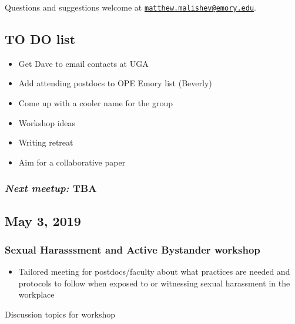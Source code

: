 \documentclass[10,portrait]{article}
\providecommand{\tightlist}{%
  \setlength{\itemsep}{0pt}\setlength{\parskip}{0pt}}
\begin{document}
Questions and suggestions welcome at
\href{mailto:matthew.malishev@emory.edu}{\nolinkurl{matthew.malishev@emory.edu}}.

\newpage  

\subsection{TO DO list}\label{to-do-list}

\begin{itemize}
\tightlist
\item
  Get Dave to email contacts at UGA\\
\item
  Add attending postdocs to OPE Emory list (Beverly)\\
\item
  Come up with a cooler name for the group\\
\item
  Workshop ideas\\
\item
  Writing retreat\\
\item
  Aim for a collaborative paper
\end{itemize}

\subsubsection{\texorpdfstring{\emph{Next meetup:}
TBA}{Next meetup: TBA}}\label{next-meetup-tba}

\newpage    

\subsection{May 3, 2019}\label{may-3-2019}

\subsubsection{Sexual Harasssment and Active Bystander
workshop}\label{sexual-harasssment-and-active-bystander-workshop}

\begin{itemize}
\tightlist
\item
  Tailored meeting for postdocs/faculty about what practices are needed
  and protocols to follow when exposed to or witnessing sexual
  harassment in the workplace
\end{itemize}

Discussion topics for workshop
\end{document}
